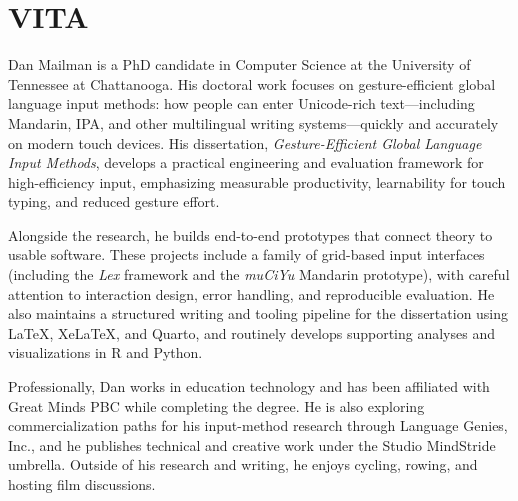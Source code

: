 \chapter*{VITA}

Dan Mailman is a PhD candidate in Computer Science at the University of Tennessee at Chattanooga. His doctoral work focuses on gesture-efficient global language input methods: how people can enter Unicode-rich text---including Mandarin, IPA, and other multilingual writing systems---quickly and accurately on modern touch devices. His dissertation, \emph{Gesture-Efficient Global Language Input Methods}, develops a practical engineering and evaluation framework for high-efficiency input, emphasizing measurable productivity, learnability for touch typing, and reduced gesture effort.



Alongside the research, he builds end-to-end prototypes that connect theory to usable software. These projects include a family of grid-based input interfaces (including the \emph{\textmu Lex} framework and the \emph{muCiYu} Mandarin prototype), with careful attention to interaction design, error handling, and reproducible evaluation. He also maintains a structured writing and tooling pipeline for the dissertation using LaTeX, XeLaTeX, and Quarto, and routinely develops supporting analyses and visualizations in R and Python.



Professionally, Dan works in education technology and has been affiliated with Great Minds PBC while completing the degree. He is also exploring commercialization paths for his input-method research through Language Genies, Inc., and he publishes technical and creative work under the Studio MindStride umbrella. Outside of his research and writing, he enjoys cycling, rowing, and hosting film discussions.

